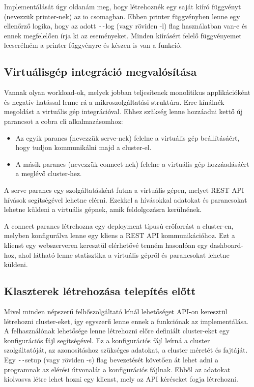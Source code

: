 Implementálását úgy oldanám meg, hogy létrehoznék egy saját kiíró függvényt (nevezzük printer-nek) az io csomagban.
Ebben printer függvényben lenne egy ellenőrző logika, hogy az adott \texttt{-{}-}log (vagy röviden -l) flag használatban van-e és ennek megfelelően írja ki az eseményeket. Minden kiírásért felelő függvényemet lecserélném a printer függvényre és készen is van a funkció. 

\subsection{Virtuálisgép integráció megvalósítása}
Vannak olyan workload-ok, melyek jobban teljesítenek monolitikus applikációként és negatív hatással lenne rá a mikroszolgáltatási struktúra.
Erre kínálnék megoldást a virtuális gép integrációval.
Ehhez szükség lenne hozzáadni kettő új parancsot a cobra cli alkalmazásomhoz:
\begin{itemize}
  \item Az egyik parancs (nevezzük serve-nek) felelne a virtuális gép beállításáért, hogy tudjon kommunikálni majd a cluster-el.
  \item A másik parancs (nevezzük connect-nek) felelne a virtuális gép hozzáadásáért a meglévő cluster-hez.
\end{itemize}

A serve parancs egy szolgáltatásként futna a virtuális gépen, melyet REST API hívások segítségével lehetne elérni.
Ezekkel a hívásokkal adatokat és parancsokat lehetne küldeni a virtuális gépnek, amik feldolgozásra kerülnének.

A connect parancs létrehozna egy deployment típusú erőforrást a cluster-en, melyben konfigurálva lenne egy kliens a REST API kommunikációhoz.
Ezt a klienst egy webszerveren keresztül elérhetővé tenném hasonlóan egy dashboard-hoz, ahol látható lenne statisztika a virtuális gépről és parancsokat lehetne küldeni.

\subsection{Klaszterek létrehozása telepítés előtt}
Mivel minden népszerű felhőszolgáltató kínál lehetőséget API-on keresztül létrehozni cluster-eket, így egyszerű lenne ennek a funkciónak az implementálása.
A felhasználónak lehetősége lenne létrehozni előre definiált cluster-eket egy konfigurációs fájl segítségével.
Ez a konfigurációs fájl leírná a cluster szolgáltatóját, az azonosításhoz szükséges adatokat, a cluster méretét és fajtáját.
Egy \texttt{-{}-}setup (vagy röviden -s) flag bevezetését követően át lehet adni a programnak az elérési útvonalát a konfigurációs fájlnak.
Ebből az adatokat kiolvasva létre lehet hozni egy klienst, mely az API kéréseket fogja létrehozni.


